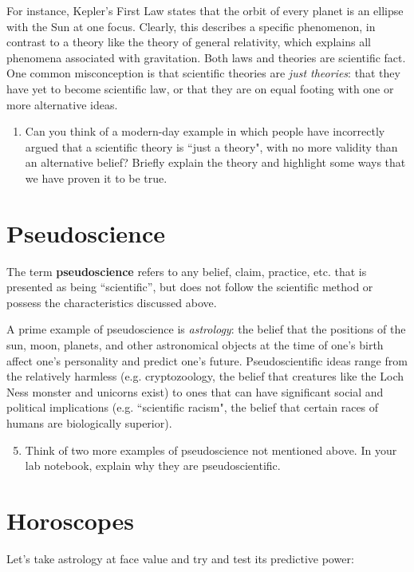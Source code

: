\documentclass[12pt]{article}
\newcommand\setItemnumber[1]{\setcounter{enumi}{\numexpr#1-1\relax}}
\begin{document}
For instance, Kepler's First Law states that the orbit of every planet is an ellipse with the Sun at one focus. Clearly, this describes a specific phenomenon, in contrast to a theory like the theory of general relativity, which explains all phenomena associated with gravitation. Both laws and theories are scientific fact. One common misconception is that scientific theories are \textit{just theories}: that they have yet to become scientific law, or that they are on equal footing with one or more alternative ideas. 

\begin{enumerate}
\setItemnumber{4}
\item Can you think of a modern-day example in which people have incorrectly argued that a scientific theory is ``just a theory", with no more validity than an alternative belief? Briefly explain the theory and highlight some ways that we have proven it to be true.
\end{enumerate} 

\section{Pseudoscience}
The term \textbf{pseudoscience} refers to any belief, claim, practice, etc. that is presented as being ``scientific'', but does not follow the scientific method or possess the characteristics discussed above.

A prime example of pseudoscience is \textit{astrology}: the belief that the positions of the sun, moon, planets, and other astronomical objects at the time of one's birth affect one's personality and predict one's future. Pseudoscientific ideas range from the relatively harmless (e.g. cryptozoology, the belief that creatures like the Loch Ness monster and unicorns exist) to ones that can have significant social and political implications (e.g. ``scientific racism", the belief that certain races of humans are biologically superior).
\begin{enumerate}
\setcounter{enumi}{4}
    \item Think of two more examples of pseudoscience not mentioned above. In your lab notebook, explain why they are pseudoscientific.
\end{enumerate}  

\section{Horoscopes}
Let's take astrology at face value and try and test its predictive power:
\end{document}
